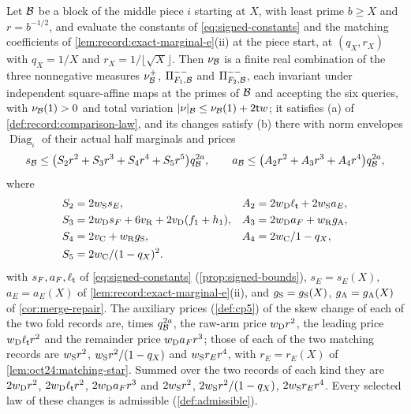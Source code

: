 \begin{lemma}\label{lem:middle-comparison-prices}
Let $\mathcal B$ be a block of the middle piece $i$ starting at $X$, with least prime
$b\ge X$ and $r=b^{-1/2}$, and evaluate the constants of
\eqref{eq:signed-constants} and the matching coefficients of
\cref{lem:record:exact-marginal-e}(ii) at the piece start, at $(q_X,r_X)$ with
$q_X=1/X$ and $r_X=1/\lfloor\sqrt X\rfloor$. Then
$\nu_\mathcal B$ is a finite real combination of the three nonnegative measures
$\nu^+_\mathcal B$, $\Pi^{--}_{F_1,\mathcal B}$ and $\Pi^{--}_{F_2,\mathcal B}$, each invariant under
independent square-affine maps at the primes of $\mathcal B$ and accepting the six
queries, with $\nu_\mathcal B(1)>0$ and total variation
$|\nu|_\mathcal B\le\nu_\mathcal B(1)+2\mathsf t w$; it satisfies (a)
of \cref{def:record:comparison-law}, and its changes satisfy (b) there with norm
envelopes $\operatorname{Diag}_\iota$ of their actual half marginals and prices
\[
 s_\mathcal B\le\bigl(S_2r^2+S_3r^3+S_4r^4+S_5r^5\bigr)q_\mathcal B^{2a},\qquad
 a_\mathcal B\le\bigl(A_2r^2+A_3r^3+A_4r^4\bigr)q_\mathcal B^{2a},
\]
where
\begin{align*}
 S_2&=2w_{\rm S}s_E,&
 A_2&=2w_{\rm D}\ell_\mathsf t+2w_{\rm S}a_E,\\
 S_3&=2w_{\rm D}s_F+6v_{\rm R}+2v_{\rm D}(f_1+h_1),&
 A_3&=2w_{\rm D}a_F+w_{\rm R}g_{\rm A},\\
 S_4&=2v_{\rm C}+w_{\rm R}g_{\rm S},&
 A_4&=2w_{\rm C}/1-q_X,\\
 S_5&=2w_{\rm C}/(1-q_X)^2.&&
\end{align*}
with $s_F,a_F,\ell_\mathsf t$ of \eqref{eq:signed-constants} (\cref{prop:signed-bounds}),
$s_E=s_E(X)$, $a_E=a_E(X)$ of \cref{lem:record:exact-marginal-e}(ii), and
$g_{\rm S}=g_{\rm S}(X)$, $g_{\rm A}=g_{\rm A}(X)$ of \cref{cor:merge-repair}. The auxiliary prices
(\cref{def:cp5}) of the skew change of each of the two fold records are, times
$q_\mathcal B^{2a}$, the raw-arm price $w_{\rm D}r^2$, the leading price
$w_{\rm D}\ell_\mathsf t r^2$ and the remainder price $w_{\rm D}a_Fr^3$; those of each
of the two matching records are $w_{\rm S}r^2$, $w_{\rm S}r^2/(1-q_X)$ and
$w_{\rm S}r_Er^4$, with $r_E=r_E(X)$ of \cref{lem:oct24:matching-star}. Summed over
the two records of each kind they are $2w_{\rm D}r^2$, $2w_{\rm D}\ell_\mathsf t r^2$,
$2w_{\rm D}a_Fr^3$ and $2w_{\rm S}r^2$, $2w_{\rm S}r^2/(1-q_X)$, $2w_{\rm S}r_Er^4$.
Every selected law of these changes is admissible (\cref{def:admissible}).
\end{lemma}

